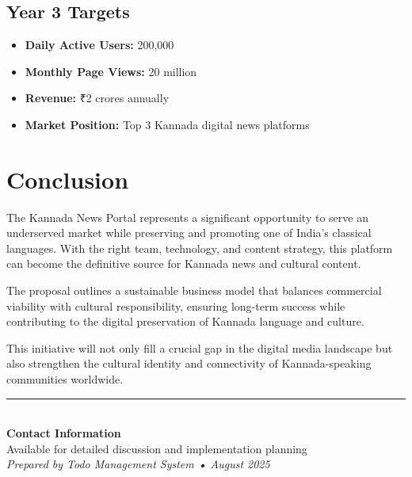 \documentclass[11pt,a4paper]{article}
\begin{document}
\subsection{Year 3 Targets}
\begin{itemize}[leftmargin=2em]
    \item \textbf{Daily Active Users:} 200,000
    \item \textbf{Monthly Page Views:} 20 million
    \item \textbf{Revenue:} ₹2 crores annually
    \item \textbf{Market Position:} Top 3 Kannada digital news platforms
\end{itemize}

\section{Conclusion}

\begin{highlight}
The Kannada News Portal represents a significant opportunity to serve an underserved market while preserving and promoting one of India's classical languages. With the right team, technology, and content strategy, this platform can become the definitive source for Kannada news and cultural content.
\end{highlight}

The proposal outlines a sustainable business model that balances commercial viability with cultural responsibility, ensuring long-term success while contributing to the digital preservation of Kannada language and culture.

This initiative will not only fill a crucial gap in the digital media landscape but also strengthen the cultural identity and connectivity of Kannada-speaking communities worldwide.

\vfill

\begin{center}
\rule{0.8\textwidth}{0.5pt}\\
\vspace{0.5cm}
\textbf{Contact Information}\\
Available for detailed discussion and implementation planning\\
\textit{Prepared by Todo Management System • August 2025}
\end{center}
\end{document}
